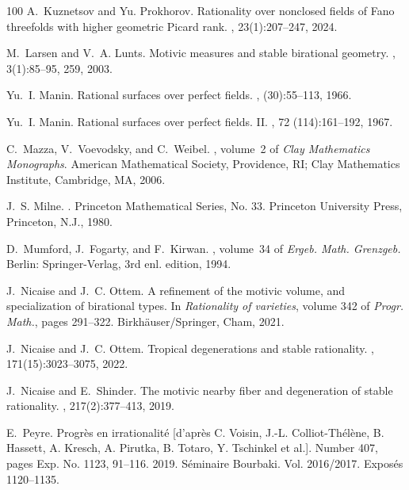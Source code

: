 \documentclass[12pt,reqno]{amsart}
\theoremstyle{plain}
\theoremstyle{remark}
\theoremstyle{definition}
\numberwithin{equation}{section}
\begin{document}
\begin{thebibliography}{100}
A.~Kuznetsov and Yu. Prokhorov.
\newblock Rationality over nonclosed fields of {F}ano threefolds with higher
  geometric {P}icard rank.
, 23(1):207--247, 2024.

M.~Larsen and V.~A. Lunts.
\newblock Motivic measures and stable birational geometry.
, 3(1):85--95, 259, 2003.

Yu.~I. Manin.
\newblock Rational surfaces over perfect fields.
, (30):55--113, 1966.

Yu.~I. Manin.
\newblock Rational surfaces over perfect fields. {II}.
, 72 (114):161--192, 1967.

C.~Mazza, V.~Voevodsky, and C.~Weibel.
, volume~2 of {\em Clay
  Mathematics Monographs}.
\newblock American Mathematical Society, Providence, RI; Clay Mathematics
  Institute, Cambridge, MA, 2006.

J.~S. Milne.
.
\newblock Princeton Mathematical Series, No. 33. Princeton University Press,
  Princeton, N.J., 1980.

D.~Mumford, J.~Fogarty, and F.~Kirwan.
, volume~34 of {\em Ergeb. Math.
  Grenzgeb.}
\newblock Berlin: Springer-Verlag, 3rd enl. edition, 1994.

J.~Nicaise and J.~C. Ottem.
\newblock A refinement of the motivic volume, and specialization of birational
  types.
\newblock In {\em Rationality of varieties}, volume 342 of {\em Progr. Math.},
  pages 291--322. Birkh\"auser/Springer, Cham, 2021.

J.~Nicaise and J.~C. Ottem.
\newblock Tropical degenerations and stable rationality.
, 171(15):3023--3075, 2022.

J.~Nicaise and E.~Shinder.
\newblock The motivic nearby fiber and degeneration of stable rationality.
, 217(2):377--413, 2019.

E.~Peyre.
\newblock Progr\`es en irrationalit\'e{} [d'apr\`es {C}. {V}oisin, {J}.-{L}.
  {C}olliot-{T}h\'el\`ene, {B}. {H}assett, {A}. {K}resch, {A}. {P}irutka, {B}.
  {T}otaro, {Y}. {T}schinkel et al.].
\newblock Number 407, pages Exp. No. 1123, 91--116. 2019.
\newblock S\'eminaire Bourbaki. Vol. 2016/2017. Expos\'es 1120--1135.


\end{thebibliography}
\end{document}
